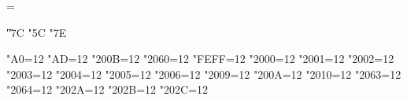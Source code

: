 \def\columnbreak{\vfill\eject}

\newcount\badspacepenalty {}
\emergencystretch=1in
\vfuzz=2pt
\maxdepth=\maxdimen
\frenchspacing


\def\intercharspace{\nobreak\hskip0pt}
\def\SFTHYPHEN{\-}
\def\NBSP{\nobreak\space} %
\def\ZWSP{\penalty0\intercharspace\relax} %
\def\WJ{\leavevmode\nobreak} %
\def\ZWNBSP{\WJ} %
\def\NQUAD{\BADBREAK\relax\space} %
\def\MQUAD{\BADBREAK\hskip 1em plus .2em minus .2em}
\def\MSPACE{\hskip 1em} %
\def\NSPACE{\hbox{\space}} %
\def\THREEPEREMSPACE{\hskip .333em}
\def\FOURPEREMSPACE{\hskip .25em}
\def\SIXPEREMSPACE{\hskip .1666em}
\def\THINSPACE{\hskip .2em plus .1em minus .1em}
\def\HAIRSPACE{\nobreak\hskip 0.042em\nobreak\intercharspace} %
\def\HYPHEN{\char"2010\discretionary{}{}{}}%
\def\LINESEP{\break}
\def\GOODBREAK{\penalty-\OptionalBreakPenalty}
\def\BADBREAK{\penalty\the\badspacepenalty}
\def\emdash{\char"2014\relax}
\chardef\|"7C
\chardef\bslash"5C%
\chardef\tilde"7E%

\let\pr@tect=\relax
\def\pr@tectspecials{%
  \let\SFTHYPHEN=\relax
  \let\NBSP=\relax
  \let\ZWSP=\relax
  \let\ZWNBSP=\relax
  \let\WJ=\relax
  \let\NQUAD=\relax
  \let\MQUAD=\relax
  \let\MSPACE=\relax
  \let\NSPACE=\relax
  \let\THREEPEREMSPACE=\relax
  \let\FOURPEREMSPACE=\relax
  \let\SIXPEREMSPACE=\relax
  \let\THINSPACE=\relax
  \let\HAIRSPACE=\relax
  \let\HYPHEN=\relax
  \let\LINESEP=\relax
  \let\GOODBREAK=\relax
  \let\BADBREAK=\relax
}

\catcode"A0=12
\catcode"AD=12
\catcode"200B=12
\catcode"2060=12
\catcode"FEFF=12
\catcode"2000=12
\catcode"2001=12
\catcode"2002=12
\catcode"2003=12
\catcode"2004=12
\catcode"2005=12
\catcode"2006=12
\catcode"2009=12
\catcode"200A=12
\catcode"2010=12
\catcode"2063=12
\catcode"2064=12
\catcode"202A=12
\catcode"202B=12
\catcode"202C=12
\def\liter@lspecials{%
  \def\pr@tect{}%
  \def\NBSP{^^a0}%
  \def\SFTHYPHEN{^^ad}%
  \def\ZWSP{^^^^200b}%
  \def\WJ{^^^^2060}%
  \def\ZWNBSP{^^^^feff}%
  \def\NQUAD{^^^^2000}%
  \def\MQUAD{^^^^2001}%
  \def\NSPACE{^^^^2002}%
  \def\MSPACE{^^^^2003}%
  \def\THREEPEREMSPACE{^^^^2004}%
  \def\FOURPEREMSPACE{^^^^2005}%
  \def\SIXPEREMSPACE{^^^^2006}%
  \def\THINSPACE{^^^^2009}%
  \def\HAIRSPACE{^^^^200a}%
  \def\HYPHEN{^^^^2010}%
  \def\LINESEP{^^^^2028}%
  \def\GOODBREAK{^^^^2063}%
  \def\BADBREAK{^^^^2064}%
}

